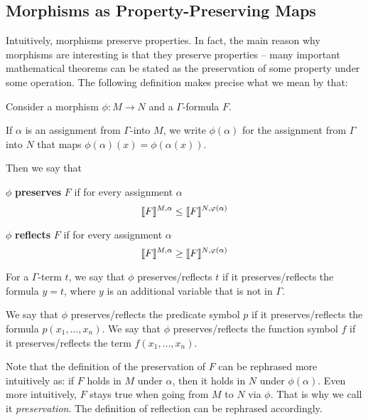 \subsection{Morphisms as Property-Preserving Maps}

Intuitively, morphisms preserve properties.
In fact, the main reason why morphisms are interesting is that they preserve properties -- many important mathematical theorems can be stated as the preservation of some property under some operation.
The following definition makes precise what we mean by that:

\begin{definition}
Consider a morphism $\phi:M\to N$ and a $\Gamma$-formula $F$.

If $\alpha$ is an assignment from $\Gamma$-into $M$, we write $\phi(\alpha)$ for the assignment from $\Gamma$ into $N$ that maps $\phi(\alpha)(x)=\phi(\alpha(x))$.

Then we say that
\begin{compactitem}
\item $\phi$ \textbf{preserves} $F$ if for every assignment $\alpha$
\[\llbracket F\rrbracket^{M,\alpha}\leq \llbracket F\rrbracket^{N,\varphi(\alpha)}\]
\item $\phi$ \textbf{reflects} $F$ if for every assignment $\alpha$
\[\llbracket F\rrbracket^{M,\alpha}\geq \llbracket F\rrbracket^{N,\varphi(\alpha)}\]
\end{compactitem}
For a $\Gamma$-term $t$, we say that $\phi$ preserves/reflects $t$ if it preserves/reflects the formula $y=t$, where $y$ is an additional variable that is not in $\Gamma$.

We say that $\phi$ preserves/reflects the predicate symbol $p$ if it preserves/reflects the formula $p(x_1,\ldots,x_n)$.
We say that $\phi$ preserves/reflects the function symbol $f$ if it preserves/reflects the term $f(x_1,\ldots,x_n)$.
\end{definition}


Note that the definition of the preservation of $F$ can be rephrased more intuitively as: if $F$ holds in $M$ under $\alpha$, then it holds in $N$ under $\phi(\alpha)$.
Even more intuitively, $F$ stays true when going from $M$ to $N$ via $\phi$.
That is why we call it \emph{preservation}.
The definition of reflection can be rephrased accordingly.

